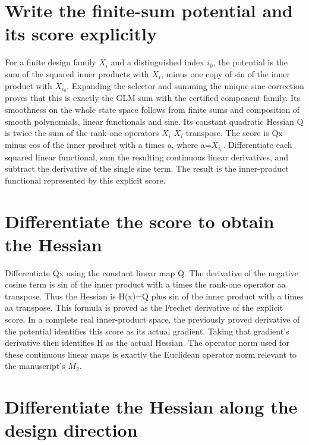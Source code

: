 \documentclass[11pt,a4paper]{article}
\begin{document}
\section{\texorpdfstring{Write the finite-\allowbreak{}sum potential and its score explicitly}{Write the finite-sum potential and its score explicitly}}


For a finite design family \(X_i\) and a distinguished index \(i_0\), the potential is the sum of the squared inner products with \(X_i\), minus one copy of sin of the inner product with \(X_{i_0}\). Expanding the selector and summing the unique sine correction proves that this is exactly the GLM sum with the certified component family. Its smoothness on the whole state space follows from finite sums and composition of smooth polynomials, linear functionals and sine. Its constant quadratic Hessian Q is twice the sum of the rank-one operators \(X_i\) \(X_i\) transpose. The score is Qx minus cos of the inner product with a times a, where a=\(X_{i_0}\). Differentiate each squared linear functional, sum the resulting continuous linear derivatives, and subtract the derivative of the single sine term. The result is the inner-product functional represented by this explicit score.


\section{\texorpdfstring{Differentiate the score to obtain the Hessian}{Differentiate the score to obtain the Hessian}}


Differentiate Qx using the constant linear map Q. The derivative of the negative cosine term is sin of the inner product with a times the rank-one operator aa transpose. Thus the Hessian is H(x)=Q plus sin of the inner product with a times aa transpose. This formula is proved as the Frechet derivative of the explicit score. In a complete real inner-product space, the previously proved derivative of the potential identifies this score as its actual gradient. Taking that gradient's derivative then identifies H as the actual Hessian. The operator norm used for these continuous linear maps is exactly the Euclidean operator norm relevant to the manuscript's \(M_2\).


\section{\texorpdfstring{Differentiate the Hessian along the design direction}{Differentiate the Hessian along the design direction}}
\end{document}
